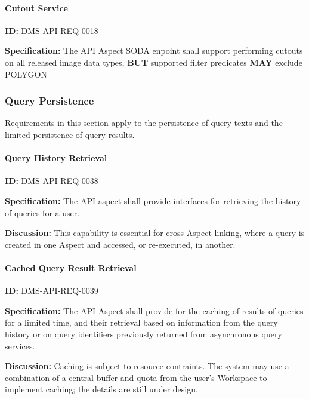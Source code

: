 \documentclass[SE,toc,lsstdraft]{lsstdoc}
\begin{document}
\paragraph{Cutout Service}\hfill  %

\label{DMS-API-REQ-0018}
\textbf{ID:} DMS-API-REQ-0018

\textbf{Specification:}
The API Aspect SODA enpoint shall support performing cutouts on all released image data types, \textbf{BUT} supported filter predicates \textbf{MAY} exclude POLYGON

\subsubsection{Query Persistence}

Requirements in this section apply to the persistence of query texts and the limited persistence of query results.

\paragraph{Query History Retrieval}\hfill  %

\label{DMS-API-REQ-0038}
\textbf{ID:} DMS-API-REQ-0038

\textbf{Specification:}
The API aspect shall provide interfaces for retrieving the history of queries for a user.

\textbf{Discussion:}
This capability is essential for cross-Aspect linking, where a query is created in one Aspect and accessed, or re-executed, in another.

\paragraph{Cached Query Result Retrieval}\hfill  %

\label{DMS-API-REQ-0039}
\textbf{ID:} DMS-API-REQ-0039

\textbf{Specification:}
The API Aspect shall provide for the caching of results of queries for a limited time, and their retrieval based on information from the query history or on query identifiers previously returned from asynchronous query services.

\textbf{Discussion:}
Caching is subject to resource contraints.  The system may use a combination of a central buffer and quota from the user's Workspace to implement caching; the details are still under design.
\end{document}

